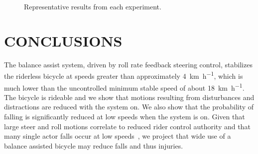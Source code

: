 \documentclass{icsc}
\def\kph{\kilo\meter\per\hour}
\begin{document}
\begin{figure}[t]
  \begin{center}
    \caption{Representative results from each experiment.}
    \label{fig:results}
  \end{center}
\end{figure}

\section{CONCLUSIONS}
%
The balance assist system, driven by roll rate feedback steering control,
stabilizes the riderless bicycle at speeds greater than approximately
4~\si{\kph}, which is much lower than the uncontrolled minimum stable speed
of about 18~\si{\kph}. The bicycle is rideable and we show that motions resulting
from disturbances and distractions are reduced with the system on. We also show
that the probability of falling is significantly reduced at low speeds when the
system is on. Given that large steer and roll motions correlate to reduced
rider control authority and that many single actor falls occur at low
speeds~\cite{Wegman2024}, we project that wide use of a balance assisted
bicycle may reduce falls and thus injuries.



\end{document}
